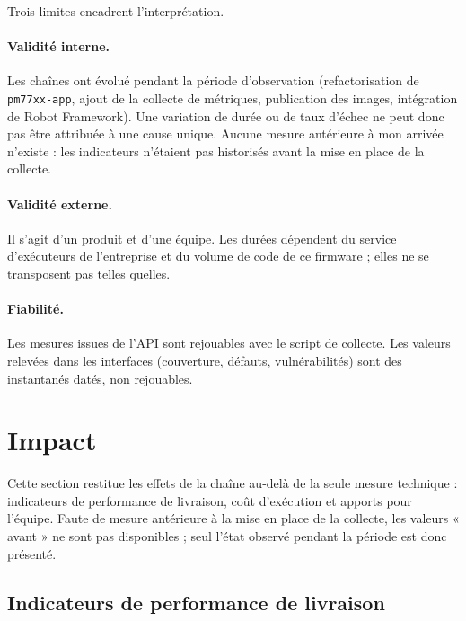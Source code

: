 Trois limites encadrent l'interprétation.

\paragraph{Validité interne.} Les chaînes ont évolué pendant la période
d'observation (refactorisation de \texttt{pm77xx-app}, ajout de la collecte de
métriques, publication des images, intégration de Robot Framework). Une variation
de durée ou de taux d'échec ne peut donc pas être attribuée à une cause unique.
Aucune mesure antérieure à mon arrivée n'existe : les indicateurs n'étaient pas
historisés avant la mise en place de la collecte.

\paragraph{Validité externe.} Il s'agit d'un produit et d'une équipe. Les
durées dépendent du service d'exécuteurs de l'entreprise et du volume de code
de ce firmware ; elles ne se transposent pas telles quelles.

\paragraph{Fiabilité.} Les mesures issues de l'API sont rejouables avec le
script de collecte. Les valeurs relevées dans les interfaces (couverture,
défauts, vulnérabilités) sont des instantanés datés, non rejouables.

\section{Impact}
\label{sec:eval-impact}

Cette section restitue les effets de la chaîne au-delà de la seule mesure
technique : indicateurs de performance de livraison, coût d'exécution et
apports pour l'équipe. Faute de mesure antérieure à la mise en place de la
collecte, les valeurs « avant » ne sont pas disponibles ; seul l'état observé
pendant la période est donc présenté.

\subsection{Indicateurs de performance de livraison}
\label{sec:eval-dora}

